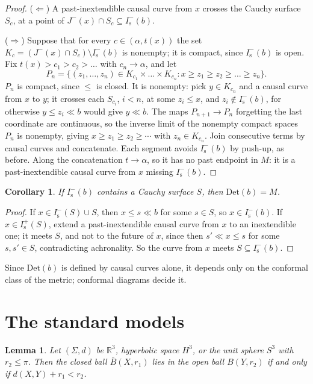 \documentclass[11pt]{article}
\newtheorem{lemma}[theorem]{Lemma}
\newtheorem{corollary}[theorem]{Corollary}
\theoremstyle{definition}
\newcommand{\Is}{I^-_{\mathrm s}}
\newcommand{\Isp}{I^+_{\mathrm s}}
\newcommand{\Det}{\mathrm{Det}}
\begin{document}
\begin{proof}
($\Leftarrow$) A past-inextendible causal curve from $x$ crosses the Cauchy
surface $S_c$, at a point of $J^-(x)\cap S_c\subseteq\Is(b)$.

($\Rightarrow$) Suppose that for every $c\in(\alpha,t(x))$ the set
$K_c=(J^-(x)\cap S_c)\setminus\Is(b)$ is nonempty; it is compact, since
$\Is(b)$ is open. Fix $t(x)>c_1>c_2>\dots$ with $c_n\to\alpha$, and let
\[P_n=\{(z_1,\dots,z_n)\in K_{c_1}\times\dots\times K_{c_n}:
x\ge z_1\ge z_2\ge\dots\ge z_n\}.\]
$P_n$ is compact, since $\le$ is closed. It is nonempty: pick $y\in K_{c_n}$
and a causal curve from $x$ to $y$; it crosses each $S_{c_i}$, $i<n$, at some
$z_i\le x$, and $z_i\notin\Is(b)$, for otherwise $y\le z_i\ll b$ would give
$y\ll b$. The maps $P_{n+1}\to P_n$ forgetting the last coordinate are
continuous, so the inverse limit of the nonempty compact spaces $P_n$ is
nonempty, giving $x\ge z_1\ge z_2\ge\cdots$ with $z_n\in K_{c_n}$. Join
consecutive terms by causal curves and concatenate. Each segment avoids
$\Is(b)$ by push-up, as before. Along the concatenation $t\to\alpha$, so it has
no past endpoint in $M$: it is a past-inextendible causal curve from $x$
missing $\Is(b)$.
\end{proof}

\begin{corollary}\label{cor:cauchy}
If $\Is(b)$ contains a Cauchy surface $S$, then $\Det(b)=M$.
\end{corollary}

\begin{proof}
If $x\in\Is(S)\cup S$, then $x\le s\ll b$ for some $s\in S$, so $x\in\Is(b)$.
If $x\in\Isp(S)$, extend a past-inextendible causal curve from $x$ to an
inextendible one; it meets $S$, and not to the future of $x$, since then
$s'\ll x\le s$ for some $s,s'\in S$, contradicting achronality. So the curve
from $x$ meets $S\subseteq\Is(b)$.
\end{proof}

Since $\Det(b)$ is defined by causal curves alone, it depends only on the
conformal class of the metric; conformal diagrams decide it.

\section{The standard models}\label{sec:examples}

\begin{lemma}\label{lem:balls}
Let $(\Sigma,d)$ be $\mathbb R^3$, hyperbolic space $H^3$, or the unit sphere
$S^3$ with $r_2\le\pi$. Then the closed ball $\bar B(X,r_1)$ lies in the open
ball $B(Y,r_2)$ if and only if $d(X,Y)+r_1<r_2$.
\end{lemma}
\end{document}
